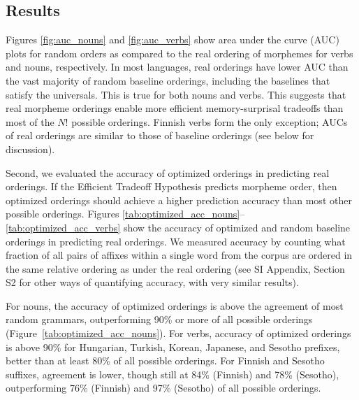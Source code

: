 \documentclass[man]{apa7}
\newcommand{\citet}{\Textcite}
\begin{document}



\subsection{Results}

Figures \ref{fig:auc_nouns} and \ref{fig:auc_verbs} show area under the curve (AUC) plots for random orders as compared to the real ordering of morphemes for verbs and nouns, respectively.
In most languages, real orderings have lower AUC than the vast majority of random baseline orderings, including the baselines that satisfy the universals. This is true for both nouns and verbs. This suggests that real morpheme orderings enable more efficient memory-surprisal tradeoffs than most of the $N!$ possible orderings.
Finnish verbs form the only exception; AUCs of real orderings are similar to those of baseline orderings (see below for discussion).

Second, we evaluated the accuracy of optimized orderings in predicting real orderings.
If the Efficient Tradeoff Hypothesis predicts morpheme order, then optimized orderings should achieve a higher prediction accuracy than most other possible orderings.
Figures \ref{tab:optimized_acc_nouns}--\ref{tab:optimized_acc_verbs} show the accuracy of optimized and random baseline orderings in predicting real orderings. 
We measured accuracy by counting what fraction of all pairs of affixes within a single word from the corpus are ordered in the same relative ordering as under the real ordering (see SI Appendix, Section S2 for other ways of quantifying accuracy, with very similar results).

For nouns, the accuracy of optimized orderings is above the agreement of most random grammars, outperforming 90\% or more of all possible orderings (Figure~\ref{tab:optimized_acc_nouns}).
For verbs, accuracy of optimized orderings is above 90\% for Hungarian, Turkish, Korean, Japanese, and Sesotho prefixes, better than at least 80\% of all possible orderings. 
For Finnish and Sesotho suffixes, agreement is lower, though still at 84\% (Finnish) and 78\% (Sesotho), outperforming 76\% (Finnish) and 97\% (Sesotho) of all possible orderings.
\end{document}
